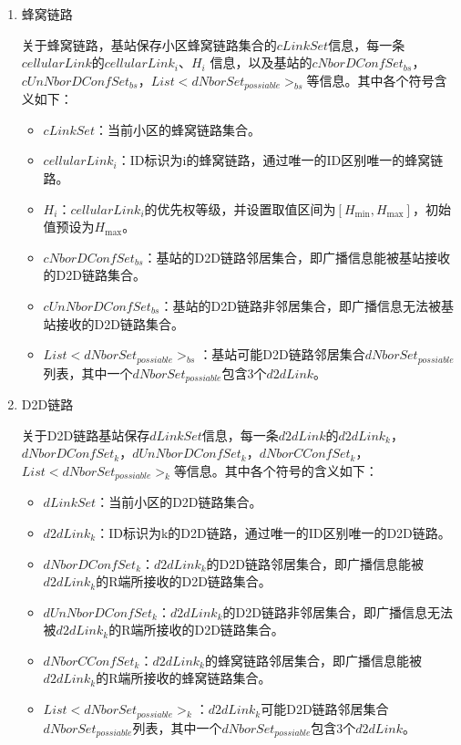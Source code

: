 \documentclass[figurelist,tablelist,algorithmlist,nomlist,masters]{seuthesix}
\begin{document}
	\begin{enumerate}
		\item 蜂窝链路
		
		
		关于蜂窝链路，基站保存小区蜂窝链路集合的$cLinkSet$信息，每一条$cellularLink$的$cellularLin{k_i}$、${H_i}$ 信息，以及基站的$cNborDConfSe{t_{bs}}$，$cUnNborDConfSe{t_{bs}}$，$List < dNborSe{t_{possiable}}{ > _{bs}}$等信息。其中各个符号含义如下：
		
		\begin{itemize}
			\item $cLinkSet$：当前小区的蜂窝链路集合。
			\item $cellularLin{k_i}$：ID标识为i的蜂窝链路，通过唯一的ID区别唯一的蜂窝链路。
			\item ${H_i}$：$cellularLin{k_i}$的优先权等级，并设置取值区间为$\left[ {{H_{\min }},{H_{\max }}} \right]$，初始值预设为${H_{\max }}$。
			\item $cNborDConfSe{t_{bs}}$：基站的D2D链路邻居集合，即广播信息能被基站接收的D2D链路集合。
			\item $cUnNborDConfSe{t_{bs}}$：基站的D2D链路非邻居集合，即广播信息无法被基站接收的D2D链路集合。
			\item $List < dNborSe{t_{possiable}}{ > _{bs}}$：基站可能D2D链路邻居集合$dNborSe{t_{possiable}}$列表，其中一个$dNborSe{t_{possiable}}$包含3个$d2dLink$。
		\end{itemize}
		
		
		\item D2D链路
		
		关于D2D链路基站保存$dLinkSet$信息，每一条$d2dLink$的$d2dLin{k_k}$，$dNborDConfSe{t_k}$，$dUnNborDConfSe{t_k}$，$dNborCConfSe{t_k}$，$List < dNborSe{t_{possiable}}{ > _k}$等信息。其中各个符号的含义如下：
		\begin{itemize}
			\item $dLinkSet$：当前小区的D2D链路集合。
			\item $d2dLin{k_k}$：ID标识为k的D2D链路，通过唯一的ID区别唯一的D2D链路。
			\item $dNborDConfSe{t_k}$：$d2dLin{k_k}$的D2D链路邻居集合，即广播信息能被$d2dLin{k_k}$的R端所接收的D2D链路集合。
			\item $dUnNborDConfSe{t_k}$：$d2dLin{k_k}$的D2D链路非邻居集合，即广播信息无法被$d2dLin{k_k}$的R端所接收的D2D链路集合。
			\item $dNborCConfSe{t_k}$：$d2dLin{k_k}$的蜂窝链路邻居集合，即广播信息能被$d2dLin{k_k}$的R端所接收的蜂窝链路集合。
			\item $List < dNborSe{t_{possiable}}{ > _k}$：$d2dLin{k_k}$可能D2D链路邻居集合$dNborSe{t_{possiable}}$列表，其中一个$dNborSe{t_{possiable}}$包含3个$d2dLink$。
		\end{itemize}
		
	\end{enumerate}
	
\end{document}

